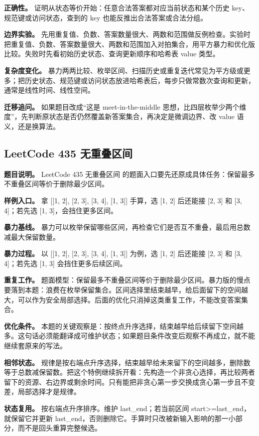\textbf{正确性。} 证明从状态等价开始：任意合法答案都对应当前状态和某个历史 key、规范键或访问状态，查到的 key 也能反推出合法答案或合法分组。

\textbf{边界实验。} 先用重复值、负数、答案数量很大、两数和范围做反例检查。实验时把重复值、负数、答案数量很大、两数和范围加入对拍集合，用平方暴力和优化版比较。失败时先看初始历史状态、查询更新顺序和哈希表 value 类型。

\textbf{复杂度变化。} 暴力两两比较、枚举区间、扫描历史或重复迭代常见为平方级或更多；把历史状态、规范键或访问状态放进哈希表后，每步只做常数次查询和更新，通常是线性时间、线性空间。

\textbf{迁移追问。} 如果题目改成“这是 meet-in-the-middle 思想，比四层枚举少两个维度”，先判断原状态是否仍然覆盖新答案集合，再决定是微调边界、改 value 语义，还是换算法。

\subsection{LeetCode 435 无重叠区间}

\textbf{题目说明。} LeetCode 435 无重叠区间 的题面入口要先还原成具体任务：保留最多不重叠区间等价于删除最少区间。

\textbf{样例入口。} 拿 [[1, 2], [2, 3], [3, 4], [1, 3]] 手算，选 [1, 2] 后还能接 [2, 3] 和 [3, 4]；若先选 [1, 3]，会挡住更多区间。

\textbf{暴力基线。} 暴力可以枚举保留哪些区间，再检查它们是否互不重叠，最后用总数减最大保留数量。

\textbf{暴力过程。} 以 [[1, 2], [2, 3], [3, 4], [1, 3]] 为例，选 [1, 2] 后还能接 [2, 3] 和 [3, 4]；若先选 [1, 3] 会挡住更多后续区间。

\textbf{重复工作。} 题面模型：保留最多不重叠区间等价于删除最少区间。暴力版的慢点要落到本题：浪费在枚举保留集合。区间选择里结束越早，给后面留下的空间越大，可以作为安全局部选择。后面的优化只消掉这类重复工作，不能改变答案集合。

\textbf{优化条件。} 本题的关键观察是：按终点升序选择，结束越早给后续留下空间越多。这句话必须能翻译成可维护状态；如果题目条件改变后观察不再成立，就不能继续套原来的写法。

\textbf{相邻状态。} 规律是按右端点升序选择，结束越早给未来留下的空间越多，删除数等于总数减保留数。把这个特例继续拆开看：先构造一个非贪心选择，再比较两者留下的资源、右边界或剩余时间。只有能把非贪心第一步交换成贪心第一步且不变差，局部选择才是规律。

\textbf{状态复用。} 按右端点升序排序。维护 last\_end；若当前区间 start>=last\_end，就保留它并更新 last\_end，否则删除它。手算时只改被新输入影响的那一小部分，而不是回头重算完整候选。

